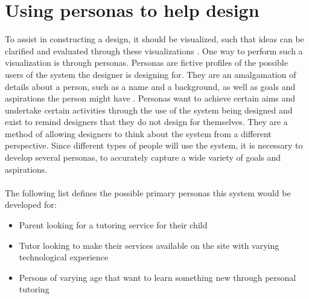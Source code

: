 \section{Using personas to help design}
To assist in constructing a design, it should be visualized, such that ideas can be clarified and evaluated through these visualizations \cite{DEB}.
One way to perform such a visualization is through personas.
Personas are fictive profiles of the possible users of the system the designer is designing for.
They are an amalgamation of details about a person, such as a name and a background, as well as goals and aspirations the person might have \cite{DEB}.
Personas want to achieve certain aims and undertake certain activities through the use of the system being designed and exist to remind designers that they do not design for themselves.
They are a method of allowing designers to think about the system from a different perspective.
Since different types of people will use the system, it is necessary to develop several personas, to accurately capture a wide variety of goals and aspirations.
\\\\
The following list defines the possible primary personas this system would be developed for:
\begin{itemize}
    \item Parent looking for a tutoring service for their child
    \item Tutor looking to make their services available on the site with varying technological experience
    \item Persons of varying age that want to learn something new through personal tutoring
\end{itemize}

